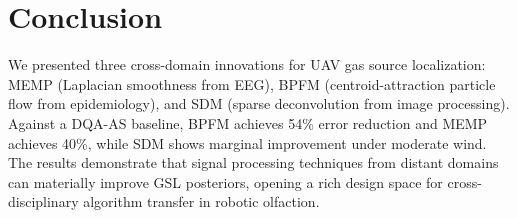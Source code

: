 \documentclass[conference]{IEEEtran}
\begin{document}
\section{Conclusion}

We presented three cross-domain innovations for UAV gas source localization: MEMP (Laplacian smoothness from EEG), BPFM (centroid-attraction particle flow from epidemiology), and SDM (sparse deconvolution from image processing).
Against a DQA-AS baseline, BPFM achieves 54\% error reduction and MEMP achieves 40\%, while SDM shows marginal improvement under moderate wind.
The results demonstrate that signal processing techniques from distant domains can materially improve GSL posteriors, opening a rich design space for cross-disciplinary algorithm transfer in robotic olfaction.
\end{document}
